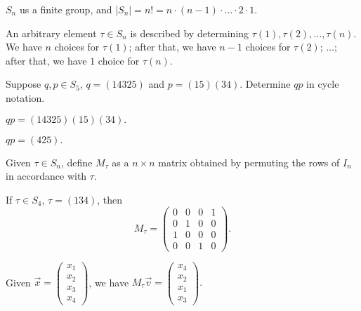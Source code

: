 
\begin{prop}
	$S_n$ us a finite group, and $|S_n| = n! = n \cdot (n-1) \cdot \dots \cdot 2 \cdot 1$.
\end{prop}

\begin{dem}
	An arbitrary element $\tau \in S_n$ is described by determining $\tau(1), \tau(2), \dots, \tau(n)$. We have $n$ choices for $\tau(1)$; after that, we have $n-1$ choices for $\tau(2)$; $\dots$; after that, we have $1$ choice for $\tau(n)$. 
\end{dem}

\begin{exmp}
	Suppose $q, p \in S_5$, $q = (1 4 3 2 5)$ and $p = (15)(34)$. Determine $qp$ in cycle notation.
\end{exmp}

\begin{ans}[Cheat] $qp = (14325) (15) (34).$
\end{ans}

\begin{ans} $qp = (425).$
\end{ans}

\begin{defn}
	Given $\tau \in S_n$, define $M_\tau$ as a $n \times n$ matrix obtained by permuting the rows of $I_n$ in accordance with $\tau$.
\end{defn}

\begin{exmp}
	If $\tau \in S_4$,  $\tau = (134)$, then
	\[M_\tau = 
	\begin{pmatrix}
		0 & 0 & 0 & 1\\
		0 & 1 & 0 & 0\\
		1 & 0 & 0 & 0\\
		0 & 0 & 1 & 0
	\end{pmatrix}.\]	
	
	Given $\vec{x} = \begin{pmatrix} x_1\\ x_2\\ x_3\\ x_4 \end{pmatrix}$, we have $M_\tau \vec{v} = \begin{pmatrix} x_4\\ x_2\\ x_1\\ x_3\end{pmatrix}.$
\end{exmp}

